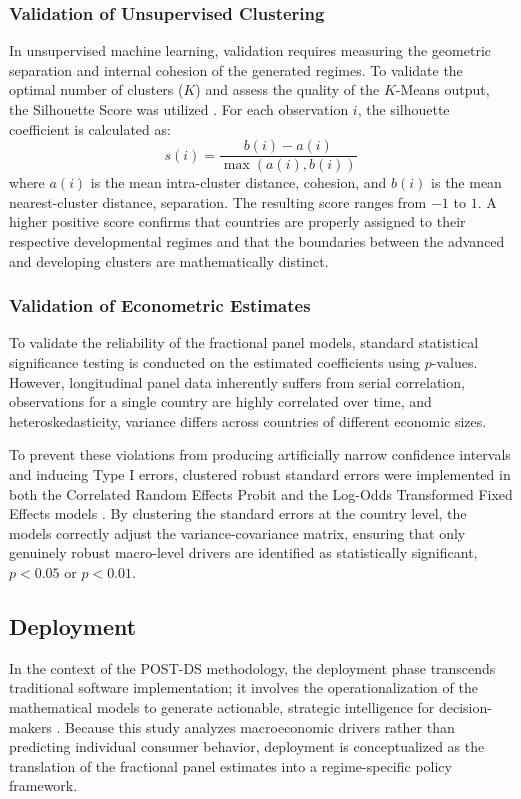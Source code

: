 \documentclass[a4paper,11pt]{article}
\begin{document}
\subsubsection{Validation of Unsupervised Clustering}
In unsupervised machine learning, validation requires measuring the geometric separation and internal cohesion of the generated regimes.
To validate the optimal number of clusters ($K$) and assess the quality of the $K$-Means output, the Silhouette Score was utilized \parencite{rousseeuw1987}. For each observation $i$, the silhouette coefficient is calculated as:
\begin{equation}
    s(i) = \frac{b(i) - a(i)}{\max(a(i), b(i))}
\end{equation}
where $a(i)$ is the mean intra-cluster distance, cohesion, and $b(i)$ is the mean nearest-cluster distance, separation.
The resulting score ranges from $-1$ to $1$.
A higher positive score confirms that countries are properly assigned to their respective developmental regimes and that the boundaries between the advanced and developing clusters are mathematically distinct.

\subsubsection{Validation of Econometric Estimates}
To validate the reliability of the fractional panel models, standard statistical significance testing is conducted on the estimated coefficients using $p$-values.
However, longitudinal panel data inherently suffers from serial correlation, observations for a single country are highly correlated over time, and heteroskedasticity, variance differs across countries of different economic sizes. 

To prevent these violations from producing artificially narrow confidence intervals and inducing Type I errors, clustered robust standard errors were implemented in both the Correlated Random Effects Probit and the Log-Odds Transformed Fixed Effects models \parencite{cameron2015}.
By clustering the standard errors at the country level, the models correctly adjust the variance-covariance matrix, ensuring that only genuinely robust macro-level drivers are identified as statistically significant, $p < 0.05$ or $p < 0.01$.

\subsection{Deployment}

In the context of the POST-DS methodology, the deployment phase transcends traditional software implementation; it involves the operationalization of the mathematical models to generate actionable, strategic intelligence for decision-makers \parencite{costa2020post}.
Because this study analyzes macroeconomic drivers rather than predicting individual consumer behavior, deployment is conceptualized as the translation of the fractional panel estimates into a regime-specific policy framework.
\end{document}
